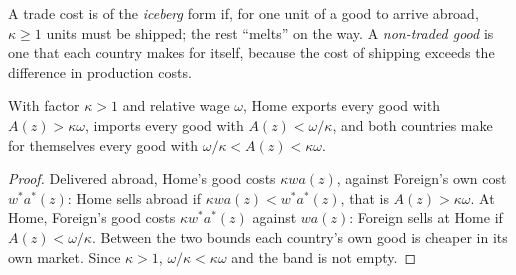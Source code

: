 \begin{definition}\label{def:b3:ricardian-trade:iceberg}
A trade cost is of the \emph{iceberg} form if, for one unit of a good to arrive
abroad, $\kappa \ge 1$ units must be shipped; the rest ``melts'' on the way. A
\emph{non-traded good} is one that each country makes for itself, because the
cost of shipping exceeds the difference in production costs.
\end{definition}

\begin{proposition}\label{prop:b3:ricardian-trade:band}
With  factor $\kappa > 1$ and relative wage $\omega$, Home exports every good
with $A(z) > \kappa\omega$, imports every good with $A(z) < \omega/\kappa$, and both
countries make for themselves every good with $\omega/\kappa < A(z) < \kappa\omega$.
\end{proposition}

\begin{proof}
Delivered abroad, Home's good costs $\kappa w a(z)$, against Foreign's own cost
$w^* a^*(z)$: Home sells abroad if $\kappa w a(z) < w^* a^*(z)$, that is $A(z) >
\kappa\omega$. At Home, Foreign's good costs $\kappa w^* a^*(z)$ against $w a(z)$:
Foreign sells at Home if $A(z) < \omega/\kappa$. Between the two bounds each
country's own good is cheaper in its own market. Since $\kappa > 1$, $\omega/\kappa <
\kappa\omega$ and the band is not empty.
\end{proof}

\begin{omfigure}
\par{}
\end{omfigure}

